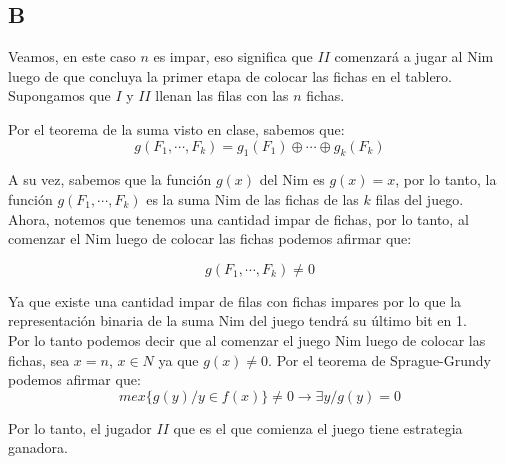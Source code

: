 \documentclass[a4paper]{article}
\begin{document}
\subsection{B}

Veamos, en este caso $n$ es impar, eso significa que $II$ comenzará a jugar al Nim luego de que concluya la primer etapa de colocar las fichas en el tablero.
Supongamos que $I$ y $II$ llenan las filas con las $n$ fichas.

Por el teorema de la suma visto en clase, sabemos que:
$$g(F_{1}, \cdots ,F_{k}) = g_{1}(F_{1}) \oplus \cdots \oplus g_{k}(F_{k})$$

A su vez, sabemos que la función $g(x)$ del Nim es $g(x)=x$, por lo tanto, la función $g(F_{1}, \cdots ,F_{k})$ es la suma Nim de las fichas de las $k$ filas del juego.\\ 

Ahora, notemos que tenemos una cantidad impar de fichas, por lo tanto, al comenzar el Nim luego de colocar las fichas podemos afirmar que:

$$g(F_{1}, \cdots ,F_{k}) \not= 0$$

Ya que existe una cantidad impar de filas con fichas impares por lo que la representación binaria de la suma Nim del juego tendrá su último bit en 1.\\

Por lo tanto podemos decir que al comenzar el juego Nim luego de colocar las fichas, sea $x = n$, $x \in N$ ya que $g(x) \not= 0$. Por el teorema de Sprague-Grundy podemos afirmar que:
$$mex\{ g(y)/y \in f(x) \} \not= 0 \rightarrow \exists y / g(y) = 0$$ 

Por lo tanto, el jugador $II$ que es el que comienza el juego tiene estrategia ganadora.




\end{document}
